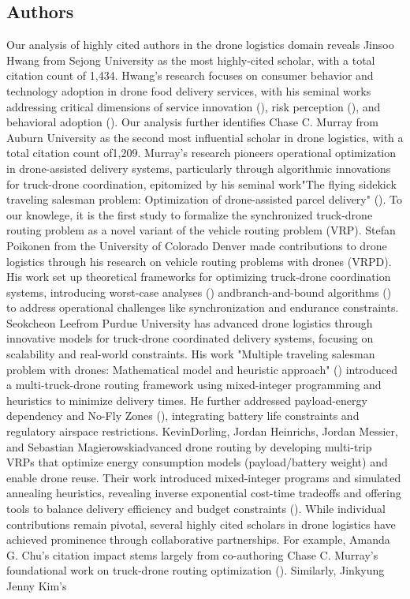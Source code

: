 \documentclass{article}
\begin{document}
\subsection{Authors}
Our analysis of highly cited authors in the drone logistics domain reveals ​​Jinsoo Hwang​​ from Sejong University as the most highly-cited scholar, with a total citation count of ​​1,434​​. Hwang’s research focuses on consumer behavior and technology adoption in drone food delivery services, with his seminal works addressing critical dimensions of service innovation (\cite{WOS:000478712400012}), risk perception (\cite{WOS:000495004400013}), and behavioral adoption (\cite{WOS:000605628800016}). Our analysis further identifies ​​Chase C. Murray​​ from Auburn University as the second most influential scholar in drone logistics, with a total citation count of ​​1,209​​. Murray’s research pioneers operational optimization in drone-assisted delivery systems, particularly through algorithmic innovations for truck-drone coordination, epitomized by his ​​seminal work​​ "The flying sidekick traveling salesman problem: Optimization of drone-assisted parcel delivery" (\cite{WOS:000353871700006}). To our knowlege, it is ​​the first study to formalize the synchronized truck-drone routing problem as a novel variant of the vehicle routing problem (VRP). Stefan Poikonen from the University of Colorado Denver made contributions to drone logistics through his research on ​​vehicle routing problems with drones (VRPD)​​. His work set up theoretical frameworks for optimizing truck-drone coordination systems, introducing ​​worst-case analyses (\cite{WOS:000400384200003}) and ​​branch-and-bound algorithms (\cite{WOS:000468604000010}) to address operational challenges like synchronization and endurance constraints. ​​Seokcheon Lee​​ from Purdue University has advanced drone logistics through innovative models for ​​truck-drone coordinated delivery systems​​, focusing on scalability and real-world constraints. His work "Multiple traveling salesman problem with drones: Mathematical model and heuristic approach" (\cite{WOS:000460496000002}) introduced a ​​multi-truck-drone routing framework​​ using mixed-integer programming and heuristics to minimize delivery times. He further addressed ​​payload-energy dependency​​ and ​​No-Fly Zones​​ (\cite{WOS:000474324300017}), integrating battery life constraints and regulatory airspace restrictions. Kevin ​​Dorling, Jordan Heinrichs, Jordan Messier, and Sebastian Magierowski​​ advanced drone routing by developing ​​multi-trip VRPs​​ that optimize energy consumption models (payload/battery weight) and enable ​​drone reuse​​. Their work introduced ​​mixed-integer programs​​ and ​​simulated annealing heuristics​​, revealing inverse exponential cost-time tradeoffs and offering tools to balance delivery efficiency and budget constraints (\cite{WOS:000623397300001}). While individual contributions remain pivotal, several highly cited scholars in drone logistics have achieved prominence through ​​collaborative partnerships​​. For example, ​​Amanda G. Chu's citation impact stems largely from co-authoring ​​Chase C. Murray's foundational work on truck-drone routing optimization  (\cite{WOS:000353871700006}). Similarly, ​​Jinkyung Jenny Kim​​’s 
\end{document}
